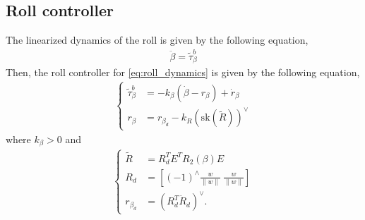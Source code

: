 \subsection{Roll controller}
\label{subsec:controller_of_roll}
The linearized dynamics of the roll is given by the following equation,
\begin{align}
    \label{eq:roll_dynamics}
    \ddot{\beta} = \tilde{\tau}_{\beta}^b
\end{align}
Then, the roll controller for \eqref{eq:roll_dynamics} is given by the following equation,
\begin{align}
    \begin{cases}
        \tilde{\tau}_{\beta}^b &= - k_{\beta} (\dot{\beta} - r_{\beta}) + \dot{r}_{\beta} \\
        r_{\beta} &= r_{\beta_d} - k_R ( \mathrm{sk}(\tilde{R}))^{\vee}
        \label{eq:controller_of_roll}
    \end{cases}
\end{align}
where $ k_{\beta} > 0 $ and
\begin{align}
    \begin{cases}
    \tilde{R} &= R_d^T E^T R_2(\beta)E \\
    R_d &= \left [(-1)^{\wedge} \frac{w}{\|w\|} ~ \frac{w}{\|w\|} \right ] \\
    r_{\beta_d} &= (R_d^T \dot{R}_d)^{\vee}.
    \label{eq:definition_of_error_angular_velocity}
    \end{cases}
\end{align}


